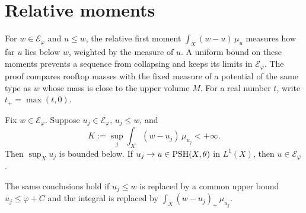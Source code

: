 \section{Relative moments}
\label{sec:big-relative-first-moment}

For $w\in\mathcal E_\varphi$ and $u\leq w$, the relative first moment $\int_X(w-u)\,\mu_u$ measures how far $u$ lies below $w$, weighted by the measure of $u$. A uniform bound on these moments prevents a sequence from collapsing and keeps its limits in $\mathcal E_\varphi$. The proof compares rooftop masses with the fixed measure of a potential of the same type as $w$ whose mass is close to the upper volume $M$. For a real number $t$, write $t_+=\max(t,0)$.

\begin{proposition}\label{prop:big-relative-first-moment}
Fix $w\in\mathcal E_\varphi$. Suppose $u_j\in\mathcal E_\varphi$, $u_j\leq w$, and
\[
 K:=\sup_j\int_X(w-u_j)\,\mu_{u_j}<+\infty.
\]
Then $\sup_Xu_j$ is bounded below. If $u_j\to u\in\mathrm{PSH}(X,\theta)$ in $L^1(X)$, then $u\in\mathcal E_\varphi$.

The same conclusions hold if $u_j\leq w$ is replaced by a common upper bound $u_j\leq\varphi+C$ and the integral is replaced by $\int_X(w-u_j)_+\,\mu_{u_j}$.
\end{proposition}
